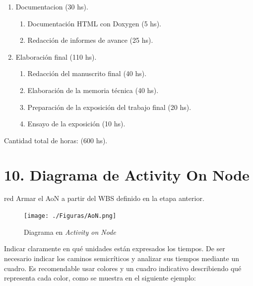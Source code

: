 \documentclass[
11pt, %
]{charter}
\begin{document}
\begin{enumerate}
\begin{enumerate}
	\end{enumerate}
\item Documentacion (30 hs).
	\begin{enumerate}
	\item Documentación HTML con Doxygen (5 hs).
	\item Redacción de informes de avance (25 hs).
	
	\end{enumerate}
\item Elaboración final (110 hs).
	\begin{enumerate}
	\item Redacción del manuscrito final (40 hs).
	\item Elaboración de la memoria técnica (40 hs).
	\item Preparación de la exposición del trabajo final (20 hs).	
	\item Ensayo de la exposición (10 hs).
	\end{enumerate}
\end{enumerate}

Cantidad total de horas: (600 hs).

\section{10. Diagrama de Activity On Node}
\label{sec:AoN}

\begin{consigna}{red}
Armar el AoN a partir del WBS definido en la etapa anterior. 



\end{consigna}

\begin{figure}[htpb]
\centering 
\texttt{[image: ./Figuras/AoN.png]}
\caption{Diagrama en \textit{Activity on Node}}
\label{fig:AoN}
\end{figure}

Indicar claramente en qué unidades están expresados los tiempos.
De ser necesario indicar los caminos semicríticos y analizar sus tiempos mediante un cuadro.
Es recomendable usar colores y un cuadro indicativo describiendo qué representa cada color, como se muestra en el siguiente ejemplo:
\end{document}
